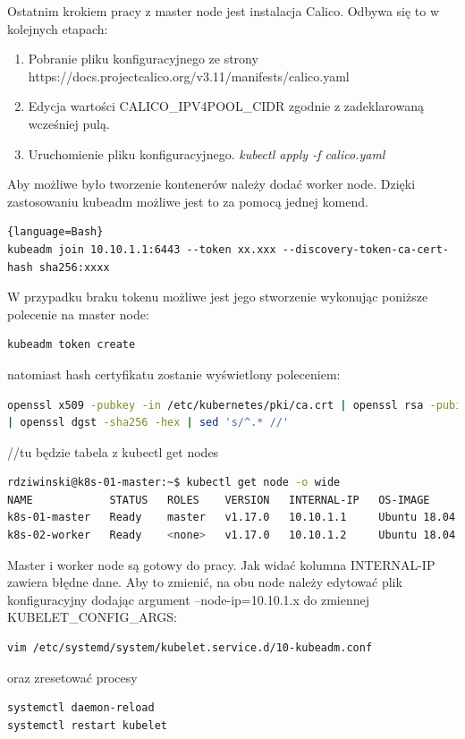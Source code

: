 \documentclass[pl,final,oneside]{mgr} %
\begin{document}
Ostatnim krokiem pracy z master node jest instalacja Calico. Odbywa się to w kolejnych etapach:
\begin{enumerate}
	\item Pobranie pliku konfiguracyjnego ze strony https://docs.projectcalico.org/v3.11/manifests/calico.yaml
	\item Edycja wartości CALICO\_IPV4POOL\_CIDR zgodnie z zadeklarowaną wcześniej pulą.
	\item Uruchomienie pliku konfiguracyjnego. \textit{kubectl apply -f calico.yaml}
\end{enumerate}

Aby możliwe było tworzenie kontenerów należy dodać worker node. Dzięki zastosowaniu kubeadm możliwe jest to za pomocą jednej komend.
\begin{lstlisting}{language=Bash}
kubeadm join 10.10.1.1:6443 --token xx.xxx --discovery-token-ca-cert-hash sha256:xxxx
\end{lstlisting}
W przypadku braku tokenu możliwe jest jego stworzenie wykonując poniższe polecenie na master node:
\begin{lstlisting}[language=Bash]
kubeadm token create
\end{lstlisting}
natomiast hash certyfikatu zostanie wyświetlony poleceniem:
\begin{lstlisting}[language=Bash]
openssl x509 -pubkey -in /etc/kubernetes/pki/ca.crt | openssl rsa -pubin -outform der 2>/dev/null \
| openssl dgst -sha256 -hex | sed 's/^.* //'
\end{lstlisting}

//tu będzie tabela z kubectl get nodes
\begin{lstlisting}[language=Bash]
rdziwinski@k8s-01-master:~$ kubectl get node -o wide
NAME            STATUS   ROLES    VERSION   INTERNAL-IP   OS-IMAGE             KERNEL-VERSION      CONTAINER-RUNTIME
k8s-01-master   Ready    master   v1.17.0   10.10.1.1     Ubuntu 18.04.3 LTS   4.15.0-72-generic   docker://19.3.4
k8s-02-worker   Ready    <none>   v1.17.0   10.10.1.2     Ubuntu 18.04.3 LTS   4.15.0-72-generic   docker://19.3.4
\end{lstlisting}


Master i worker node są gotowy do pracy. Jak widać kolumna INTERNAL-IP zawiera błędne dane. Aby to zmienić, na obu node należy edytować plik konfiguracyjny dodając argument --node-ip=10.10.1.x do zmiennej KUBELET\_CONFIG\_ARGS:
\begin{lstlisting}[language=Bash]
vim /etc/systemd/system/kubelet.service.d/10-kubeadm.conf
\end{lstlisting}
oraz zresetować procesy
\begin{lstlisting}[language=Bash]
systemctl daemon-reload
systemctl restart kubelet
\end{lstlisting}
\end{document}
